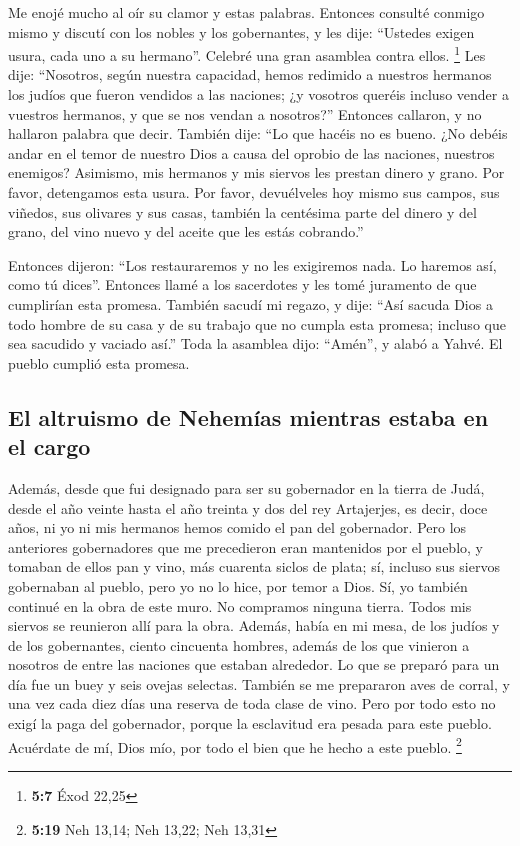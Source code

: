 \begin{paracol}{2}
 Me enojé mucho al oír su clamor y estas palabras.
 Entonces consulté conmigo mismo y discutí con los nobles
y los gobernantes, y les dije: ``Ustedes exigen usura, cada uno a su
hermano''. Celebré una gran asamblea contra ellos. \footnote{\textbf{5:7}
  Éxod 22,25}  Les dije: ``Nosotros, según nuestra
capacidad, hemos redimido a nuestros hermanos los judíos que fueron
vendidos a las naciones; ¿y vosotros queréis incluso vender a vuestros
hermanos, y que se nos vendan a nosotros?'' Entonces callaron, y no
hallaron palabra que decir.  También dije: ``Lo que hacéis
no es bueno. ¿No debéis andar en el temor de nuestro Dios a causa del
oprobio de las naciones, nuestros enemigos?  Asimismo,
mis hermanos y mis siervos les prestan dinero y grano. Por favor,
detengamos esta usura.  Por favor, devuélveles hoy mismo
sus campos, sus viñedos, sus olivares y sus casas, también la centésima
parte del dinero y del grano, del vino nuevo y del aceite que les estás
cobrando.''

 Entonces dijeron: ``Los restauraremos y no les
exigiremos nada. Lo haremos así, como tú dices''. Entonces llamé a los
sacerdotes y les tomé juramento de que cumplirían esta promesa.
 También sacudí mi regazo, y dije: ``Así sacuda Dios a
todo hombre de su casa y de su trabajo que no cumpla esta promesa;
incluso que sea sacudido y vaciado así.'' Toda la asamblea dijo:
``Amén'', y alabó a Yahvé. El pueblo cumplió esta promesa.

\hypertarget{el-altruismo-de-nehemuxedas-mientras-estaba-en-el-cargo}{%
\subsection{El altruismo de Nehemías mientras estaba en el
cargo}\label{el-altruismo-de-nehemuxedas-mientras-estaba-en-el-cargo}}

 Además, desde que fui designado para ser su gobernador
en la tierra de Judá, desde el año veinte hasta el año treinta y dos del
rey Artajerjes, es decir, doce años, ni yo ni mis hermanos hemos comido
el pan del gobernador.  Pero los anteriores gobernadores
que me precedieron eran mantenidos por el pueblo, y tomaban de ellos pan
y vino, más cuarenta siclos de plata; sí, incluso sus siervos gobernaban
al pueblo, pero yo no lo hice, por temor a Dios.  Sí, yo
también continué en la obra de este muro. No compramos ninguna tierra.
Todos mis siervos se reunieron allí para la obra. 
Además, había en mi mesa, de los judíos y de los gobernantes, ciento
cincuenta hombres, además de los que vinieron a nosotros de entre las
naciones que estaban alrededor.  Lo que se preparó para
un día fue un buey y seis ovejas selectas. También se me prepararon aves
de corral, y una vez cada diez días una reserva de toda clase de vino.
Pero por todo esto no exigí la paga del gobernador, porque la esclavitud
era pesada para este pueblo.  Acuérdate de mí, Dios mío,
por todo el bien que he hecho a este pueblo. \footnote{\textbf{5:19} Neh
  13,14; Neh 13,22; Neh 13,31}


\end{paracol}
